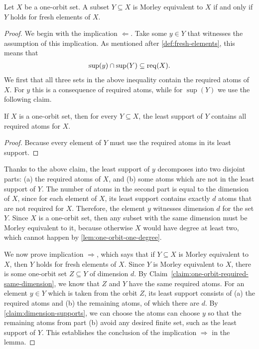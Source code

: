 \begin{lemma}\label{lem:large-subsets-fresh-elements}
    Let $X$ be a one-orbit set. A subset $Y \subseteq X$ is Morley equivalent to $X$ if and only if $Y$ holds for fresh elements of $X$.
\end{lemma}
\begin{proof}
     We begin with the  implication $\Leftarrow$. Take some $y \in Y$ that witnesses the assumption of this implication. As mentioned after \cref{def:fresh-elements}, this means that 
    \begin{align*}
    \sup(y) \cap \sup(Y) \subseteq \operatorname{req}(X).
    \end{align*}
    We first that all three sets in the above inequality contain the required atoms of $X$. For $y$ this is a consequence of required atoms, while for $\sup(Y)$ we use the following claim.
    \begin{claim}
        If $X$ is a one-orbit set, then for every $Y \subseteq X$, the least support of $Y$ contains all required atoms for $X$.  
    \end{claim}
    \begin{proof}
        Because every element of $Y$ must use the required atoms in its least support.
    \end{proof}
    Thanks to the above claim,  the least support of $y$ decomposes into two disjoint parts: (a) the required atoms of $X$, and (b) some atoms which are not in the least support of $Y$. The number of atoms in the second part is equal to the dimension of $X$, since for each element of $X$, its least support contains exactly $d$ atoms that are not required for $X$. Therefore, the element $y$ witnesses dimension $d$ for the set $Y$. Since $X$ is a one-orbit set, then any subset with the same dimension must be Morley equivalent to it, because otherwise $X$ would have degree at least two, which cannot happen by \cref{lem:one-orbit-one-degree}.

    We now prove implication $\Rightarrow$, which says that if $Y \subseteq X$ is Morley equivalent to $X$, then $Y$ holds for fresh elements of $X$.  Since $Y$ is Morley equivalent to $X$, there is some one-orbit set $Z \subseteq Y$ of dimension $d$. By Claim~\ref{claim:one-orbit-required-same-dimension}, we know that $Z$ and $Y$ have the same required atoms. For an element $y \in Y$ which is taken from the orbit $Z$, its least support consists of (a) the required atoms and (b) the remaining atoms, of which there are $d$. By \cref{claim:dimension-supports}, we can choose the atoms can choose $y$ so that the remaining atoms from part (b)  avoid any desired finite set, such as the least support of $Y$. This establishes the conclusion of the implication $\Rightarrow$ in the lemma. 
\end{proof}







